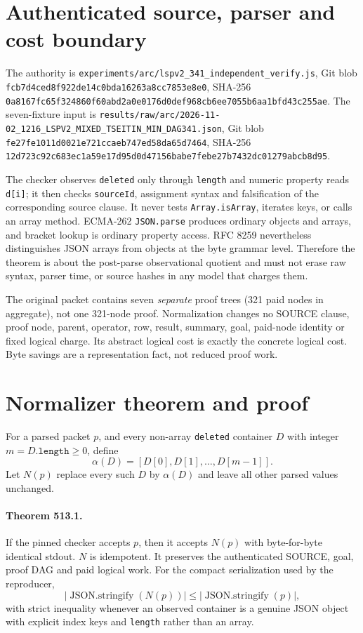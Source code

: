 \documentclass[11pt]{article}
\begin{document}
\section{Authenticated source, parser and cost boundary}

The authority is \texttt{experiments/arc/lspv2\_341\_independent\_verify.js},
Git blob \texttt{fcb7d4ced8f922de14c0bda16263a8cc7853e8e0}, SHA-256
\texttt{0a8167fc65f324860f60abd2a0e0176d0def968cb6ee7055b6aa1bfd43c255ae}.
The seven-fixture input is
\texttt{results/raw/arc/2026-11-02\_1216\_LSPV2\_MIXED\_TSEITIN\_MIN\_DAG341.json},
Git blob \texttt{fe27fe1011d0021e721ccaeb747ed58da65d7464}, SHA-256
\texttt{12d723c92c683ec1a59e17d95d0d47156babe7febe27b7432dc01279abcb8d95}.

The checker observes \texttt{deleted} only through \texttt{length} and numeric
property reads \texttt{d[i]}; it then checks \texttt{sourceId}, assignment
syntax and falsification of the corresponding source clause.  It never tests
\texttt{Array.isArray}, iterates keys, or calls an array method.  ECMA-262
\texttt{JSON.parse} produces ordinary objects and arrays, and bracket lookup is
ordinary property access.  RFC 8259 nevertheless distinguishes JSON arrays
from objects at the byte grammar level.  Therefore the theorem is about the
post-parse observational quotient and must not erase raw syntax, parser time,
or source hashes in any model that charges them.

The original packet contains seven \emph{separate} proof trees (321 paid nodes
in aggregate), not one 321-node proof.  Normalization changes no SOURCE clause,
proof node, parent, operator, row, result, summary, goal, paid-node identity or
fixed logical charge.  Its abstract logical cost is exactly the concrete
logical cost.  Byte savings are a representation fact, not reduced proof work.

\section{Normalizer theorem and proof}

For a parsed packet $p$, and every non-array \texttt{deleted} container $D$
with integer $m=D.\texttt{length}\ge 0$, define
\[
  \alpha(D)=[D[0],D[1],\ldots,D[m-1]].
\]
Let $N(p)$ replace every such $D$ by $\alpha(D)$ and leave all other parsed
values unchanged.

\paragraph{Theorem 513.1.}
If the pinned checker accepts $p$, then it accepts $N(p)$ with byte-for-byte
identical stdout.  $N$ is idempotent.  It preserves the authenticated SOURCE,
goal, proof DAG and paid logical work.  For the compact serialization used by
the reproducer,
\[
 |\operatorname{JSON.stringify}(N(p))|
 \le |\operatorname{JSON.stringify}(p)|,
\]
with strict inequality whenever an observed container is a genuine JSON
object with explicit index keys and \texttt{length} rather than an array.
\end{document}
